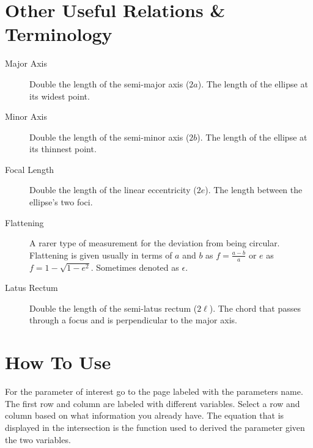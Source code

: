 \documentclass{article}
\begin{document}
\section*{Other Useful Relations \& Terminology}
\begin{description}
\item[Major Axis] Double the length of the semi-major axis ($2a$). The length of the ellipse at its widest point.
\item[Minor Axis] Double the length of the semi-minor axis ($2b$). The length of the ellipse at its thinnest point.
\item[Focal Length] Double the length of the linear eccentricity ($2e$). The length between the ellipse's two foci.
\item[Flattening] A rarer type of measurement for the deviation from being circular. Flattening is given usually in terms of $a$ and $b$ as $f=\frac{a-b}{a}$ or $e$ as $f=1-\sqrt{1-e^2}$. Sometimes denoted as $\epsilon$.
\item[Latus Rectum] Double the length of the semi-latus rectum ($2\ell$). The chord that passes through a focus and is perpendicular to the major axis.
\end{description}

\section*{How To Use}
For the parameter of interest go to the page labeled with the parameters name. 
The first row and column are labeled with different variables. 
Select a row and column based on what information you already have. 
The equation that is displayed in the intersection is the function used to derived the parameter given the two variables.    
\newpage
\end{document}
